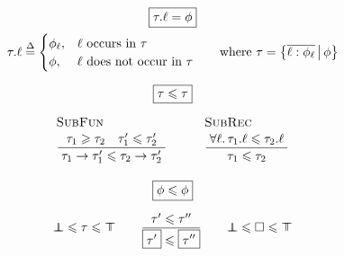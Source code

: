 $$ 
\begin{array}{c}
\boxed{\flproj{\tau}{\ell} = \phi}
\\[0.5em]
\flproj{\tau}{\ell} \defeq \begin{cases}
    \phi_\ell, & \ell \text{ occurs in } \tau \\
    \phi, & \ell \text{ does not occur in } \tau
\end{cases} \qquad \text{where } \tau = \flext{ \overline{\ell : \phi_\ell}}{\phi}
\\[1.5em]
\boxed{\tau \sub \tau}
\\[0.5em]
\irule{SubFun}{\tau_1 \super \tau_2 \quad \tau_1' \sub \tau_2'}{\tau_1 \to \tau_1' \sub \tau_2 \to \tau_2'}
\qquad
\irule{SubRec}{\forall \ell \ldotp \flproj{\tau_1}{\ell} \sub \flproj{\tau_2}{\ell}}{\tau_1 \sub \tau_2}
\\[2.5em]
\boxed{\phi \sub \phi}
\\[1em]
\flfbot \sub \tau \sub \flftop \qquad \dfrac{\tau' \sub \tau''}{\flpresent {\tau'} \sub \flpresent {\tau''}} \qquad \flfbot \sub \flabsent \sub \flftop
\end{array} 
$$
